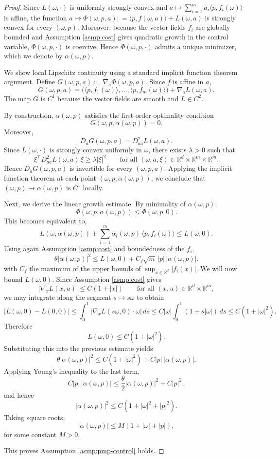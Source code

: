 \documentclass{article}
\begin{document}
\begin{proof}

Since $L(\omega,\cdot)$ is uniformly strongly convex and $
a \mapsto \sum_{i=1}^m a_i \langle p,f_i(\omega)\rangle $
is affine, the function
$
a \mapsto \Phi(\omega,p,a): =\langle p,f(\omega,a)\rangle + L(\omega,a)
$
is strongly convex for every $(\omega,p)$. Moreover, because the vector fields $f_i$ are globally bounded and Assumption \ref{asmp:cost} gives quadratic growth in the control variable, $\Phi(\omega,p,\cdot)$ is coercive. Hence $\Phi(\omega,p,\cdot)$ admits a unique minimizer, which we denote by $\alpha(\omega,p)$.

We show local Lipschitz continuity using a standard implicit function theorem argument.
Define
$G(\omega,p,a):=\nabla_a \Phi(\omega,p,a).$
Since $f$ is affine in $a$,
\[
G(\omega,p,a)
=
\bigl(\langle p,f_1(\omega)\rangle,\dots,\langle p,f_m(\omega)\rangle\bigr)
+
\nabla_a L(\omega,a).
\]
The map $G$ is $C^1$ because the vector fields are smooth and $L\in C^2$.

By construction, $\alpha(\omega,p)$ satisfies the first-order optimality condition
\[
G(\omega,p,\alpha(\omega,p))=0.
\]
Moreover,
\[
D_aG(\omega,p,a)=D^2_{aa}L(\omega,a).
\]
Since $L(\omega,\cdot)$ is strongly convex uniformly in $\omega$, there exists $\lambda>0$ such that
\[
\xi^\top D^2_{aa}L(\omega,a)\,\xi \ge \lambda |\xi|^2
\qquad
\text{for all }(\omega,a,\xi)\in\mathbb R^d\times\mathbb R^m\times\mathbb R^m.
\]
Hence $D_aG(\omega,p,a)$ is invertible for every $(\omega,p,a)$.
Applying the implicit function theorem at each point $
(\omega,p,\alpha(\omega,p))$, we conclude that $(\omega,p)\mapsto \alpha(\omega,p)$ is $C^1$ locally.

Next, we derive the linear growth estimate.
By minimality of $\alpha(\omega,p)$,
\[
\Phi(\omega,p,\alpha(\omega,p))\le \Phi(\omega,p,0).
\]
This becomes equivalent to,
\[
L(\omega,\alpha(\omega,p))
+
\sum_{i=1}^m \alpha_i(\omega,p)\,\langle p,f_i(\omega)\rangle
\le
L(\omega,0).
\]
Using again Assumption \ref{asmp:cost} and boundedness of the $f_i$,
\[
\theta |\alpha(\omega,p)|^2
\le
L(\omega,0)+ C_f\sqrt m\,|p|\,|\alpha(\omega,p)|.
\]
with $C_f$ the maximum of the upper bounds of $\sup_{x \in \mathbb{R}^d} |f_i(x)|$.
We will now bound $L(\omega,0)$. Since Assumption \ref{asmp:cost} gives
\[
|\nabla_xL(x,u)|\le C(1+|x|)
\qquad \text{for all }(x,u) \in \mathbb{R}^d \times \mathbb{R}^m,
\]
we may integrate along the segment $s\mapsto s\omega$ to obtain
\[
|L(\omega,0)-L(0,0)|
\le
\int_0^1 |\nabla_xL(s\omega,0)\cdot \omega|\,ds
\le
C|\omega|\int_0^1 (1+s|\omega|)\,ds
\le
C(1+|\omega|^2).
\]
Therefore
\[
L(\omega,0)\le C(1+|\omega|^2).
\]
Substituting this into the previous estimate yields
\[
\theta |\alpha(\omega,p)|^2
\le
C(1+|\omega|^2)+C|p|\,|\alpha(\omega,p)|.
\]
Applying Young's inequality to the last term,
\[
C|p|\,|\alpha(\omega,p)|
\le
\frac{\theta}{2}|\alpha(\omega,p)|^2 + C|p|^2,
\]
and hence
\[
|\alpha(\omega,p)|^2 \le C(1+|\omega|^2+|p|^2).
\]
Taking square roots,
\[
|\alpha(\omega,p)|\le M(1+|\omega|+|p|),
\]
for some constant $M>0$.

This proves Assumption \ref{asmp:pmp-control} holds.
\end{proof}
\end{document}
